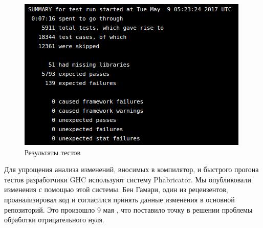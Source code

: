 \begin{figure}[H]
\centering
\includegraphics[scale=1]{pic-tests}
\caption{Результаты тестов}
\end{figure}

Для упрощения анализа изменений, вносимых в компилятор, и быстрого прогона
тестов разработчики GHC используют систему Phabricator. Мы опубликовали
изменения с помощью этой системы. \cite{phabricator} Бен Гамари, один из
рецензентов, проанализировал код и согласился принять данные изменения в
основной репозиторий. Это произошло 9 мая \cite{commit}, что поставило точку в
решении проблемы обработки отрицательного нуля.
